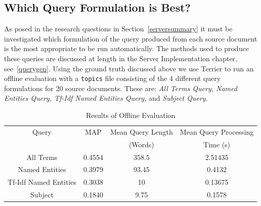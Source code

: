 \documentclass{l4proj}
\newcommand{\code}[1]{\texttt{#1}}
\begin{document}
\subsection{Which Query Formulation is Best?} \label{whichquery}
As posed in the research questions in Section~\ref{serversummary} it must be investigated which formulation of the query produced from each source document is the most appropriate to be run automatically. The methods used to produce these queries are discussed at length in the Server Implementation chapter, see~\ref{querygen}.
Using the ground truth discussed above we use Terrier to run an offline evaluation with a \code{topics} file consisting of the 4 different query formulations for 20 source documents. These are: \textit{All Terms Query, Named Entities Query, Tf-Idf Named Entities Query,} and \textit{Subject Query}.
\begin{center}
\begin{table}[h]
\centering
\begin{tabular}{|c|c|c|c|}
\hline
Query                 & MAP    & Mean Query Length & Mean Query Processing \\ 
& & (Words) & Time (s) \\\hline
All Terms             & 0.4554 & 358.5             & 2.51435                        \\ \hline
Named Entities        & 0.3979 & 93.45             & 0.4132                         \\ \hline
Tf-Idf Named Entities & 0.3038 & 10                & 0.13675                       \\ \hline
Subject               & 0.1840 & 9.75              & 0.1578                        \\ \hline
\end{tabular}
\caption{Results of Offline Evaluation}
\label{standard_results}
\end{table}
\end{center}
\end{document}
